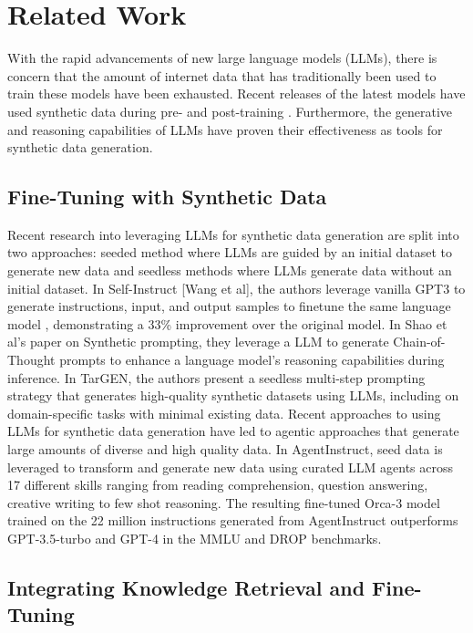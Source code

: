 \section{Related Work}

With the rapid advancements of new large language models (LLMs), there is
concern that the amount of internet data that has traditionally been used to
train these models have been exhausted. Recent releases of the latest models
have used synthetic data during pre- and post-training \citep{abdin_phi-3_2024,
dubey_llama_2024, bai_qwen_2023}. Furthermore, the generative and reasoning
capabilities of LLMs have proven their effectiveness as tools for synthetic data
generation.

\subsection{Fine-Tuning with Synthetic Data}

Recent research into leveraging LLMs for synthetic data generation are split
into two approaches: seeded method where LLMs are guided by an initial dataset
to generate new data and seedless methods where LLMs generate data without an
initial dataset. In Self-Instruct [Wang et al], the authors leverage vanilla
GPT3 to generate instructions, input, and output samples to finetune the same
language model , demonstrating a 33\% improvement over the original model. In
Shao et al’s paper on Synthetic prompting, they leverage a LLM to generate
Chain-of-Thought prompts to enhance a language model’s reasoning capabilities
during inference. In TarGEN, the authors present a seedless multi-step prompting
strategy that generates high-quality synthetic datasets using LLMs, including on
domain-specific tasks with minimal existing data. Recent approaches to using
LLMs for synthetic data generation have led to agentic approaches that generate
large amounts of diverse and high quality data. In AgentInstruct, seed data is
leveraged to transform and generate new data using curated LLM agents across 17
different skills ranging from reading comprehension, question answering,
creative writing to few shot reasoning. The resulting fine-tuned Orca-3 model
trained on the 22 million instructions generated from AgentInstruct outperforms
GPT-3.5-turbo and GPT-4 in the MMLU and DROP benchmarks.

\subsection{Integrating Knowledge Retrieval and Fine-Tuning}

